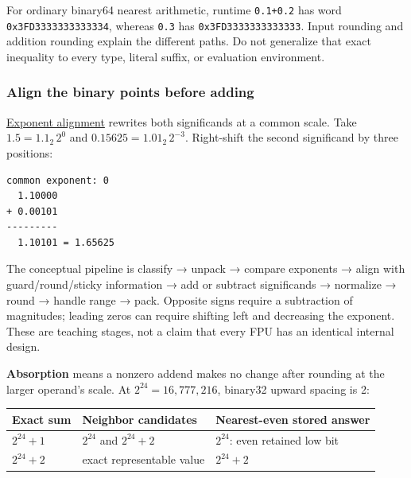 For ordinary binary64 nearest arithmetic, runtime \texttt{0.1+0.2} has word \texttt{0x3FD3333333333334}, whereas \texttt{0.3} has \texttt{0x3FD3333333333333}. Input rounding and addition rounding explain the different paths. Do not generalize that exact inequality to every type, literal suffix, or evaluation environment.

\subsubsection{Align the binary points before adding}\label{05-engine-i-ch001-align-the-binary-points-before-adding}

\hyperref[appendix-a1b1b4580dfd]{Exponent alignment} rewrites both significands at a common scale. Take \(1.5=1.1_2\,2^0\) and \(0.15625=1.01_2\,2^{-3}\). Right-shift the second significand by three positions:

\begin{verbatim}
common exponent: 0
  1.10000
+ 0.00101
---------
  1.10101 = 1.65625
\end{verbatim}

The conceptual pipeline is classify → unpack → compare exponents → align with guard/round/sticky information → add or subtract significands → normalize → round → handle range → pack. Opposite signs require a subtraction of magnitudes; leading zeros can require shifting left and decreasing the exponent. These are teaching stages, not a claim that every FPU has an identical internal design.

\textbf{Absorption} means a nonzero addend makes no change after rounding at the larger operand's scale. At \(2^{24}=16{,}777{,}216\), binary32 upward spacing is 2:

{\def\LTcaptype{none} %
\begin{longtable}[]{@{}
  >{\raggedright\arraybackslash}p{}
  >{\raggedright\arraybackslash}p{}
  >{\raggedright\arraybackslash}p{}@{}}
\toprule\noalign{}
\begin{minipage}[b]{\linewidth}\raggedright
Exact sum
\end{minipage} & \begin{minipage}[b]{\linewidth}\raggedright
Neighbor candidates
\end{minipage} & \begin{minipage}[b]{\linewidth}\raggedright
Nearest-even stored answer
\end{minipage} \\
\midrule\noalign{}
\endhead
\bottomrule\noalign{}
\endlastfoot
\(2^{24}+1\) & \(2^{24}\) and \(2^{24}+2\) & \(2^{24}\): even retained low bit \\
\(2^{24}+2\) & exact representable value & \(2^{24}+2\) \\
\end{longtable}
}

